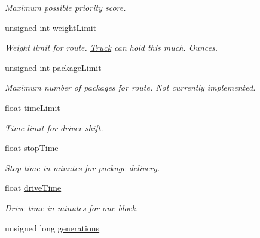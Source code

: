 \begin{DoxyCompactItemize}
\begin{DoxyCompactList}\small\item\em Maximum possible priority score. \end{DoxyCompactList}\item 
unsigned int \hyperlink{classGenetic_a4545405d58dd365147d709dcc4e7bb0a}{weight\+Limit}\hypertarget{classGenetic_a4545405d58dd365147d709dcc4e7bb0a}{}\label{classGenetic_a4545405d58dd365147d709dcc4e7bb0a}

\begin{DoxyCompactList}\small\item\em Weight limit for route. \hyperlink{classTruck}{Truck} can hold this much. Ounces. \end{DoxyCompactList}\item 
unsigned int \hyperlink{classGenetic_a0360729e64ff5021ceae7019c44feee4}{package\+Limit}\hypertarget{classGenetic_a0360729e64ff5021ceae7019c44feee4}{}\label{classGenetic_a0360729e64ff5021ceae7019c44feee4}

\begin{DoxyCompactList}\small\item\em Maximum number of packages for route. Not currently implemented. \end{DoxyCompactList}\item 
float \hyperlink{classGenetic_a0cfb34349d9415e65812928a69a7efd5}{time\+Limit}\hypertarget{classGenetic_a0cfb34349d9415e65812928a69a7efd5}{}\label{classGenetic_a0cfb34349d9415e65812928a69a7efd5}

\begin{DoxyCompactList}\small\item\em Time limit for driver shift. \end{DoxyCompactList}\item 
float \hyperlink{classGenetic_a52276cb3e4b3e5c5423c9747a3ea5631}{stop\+Time}\hypertarget{classGenetic_a52276cb3e4b3e5c5423c9747a3ea5631}{}\label{classGenetic_a52276cb3e4b3e5c5423c9747a3ea5631}

\begin{DoxyCompactList}\small\item\em Stop time in minutes for package delivery. \end{DoxyCompactList}\item 
float \hyperlink{classGenetic_a060cb30bbd912dd78fbf567410746631}{drive\+Time}
\begin{DoxyCompactList}\small\item\em Drive time in minutes for one block. \end{DoxyCompactList}\item 
unsigned long \hyperlink{classGenetic_aa2930835ae1b5aeb910f5d6a1acdc3ff}{generations}\hypertarget{classGenetic_aa2930835ae1b5aeb910f5d6a1acdc3ff}{}\label{classGenetic_aa2930835ae1b5aeb910f5d6a1acdc3ff}


\end{DoxyCompactItemize}
